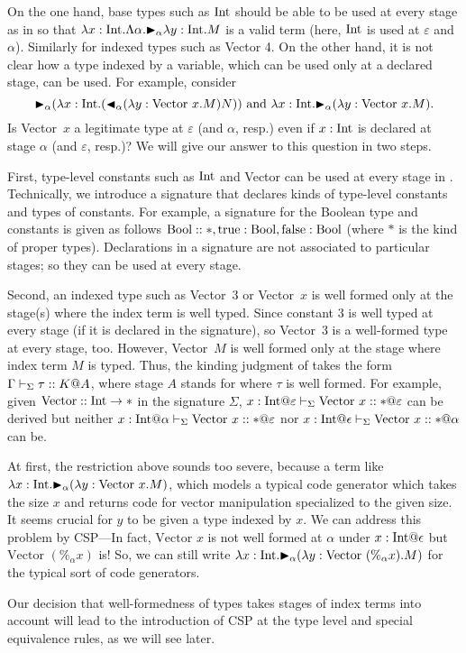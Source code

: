 On the one hand, base types such as \(\textrm{Int}\) should be able to be used
at every stage as in \LTP so that
\(\lambda x:\textrm{Int}.\Lambda \alpha. {\mathop{\blacktriangleright}}_\alpha \lambda y:\textrm{Int}.M\) is a valid
term (here, \(\textrm{Int}\) is used at \(\varepsilon\) and \(\alpha\)).
Similarly for indexed types such as Vector 4.  On the other hand, it
is not clear how a type indexed by a variable, which can be used only
at a declared stage, can be used.  For example,
consider
\[{\mathop{\blacktriangleright}}_\alpha (\lambda x:\textrm{Int}. ({\mathop{\blacktriangleleft}}_\alpha (\lambda y:\text{Vector
  }x.M)N) )
  \text{ and }
  \lambda x:\textrm{Int}. {\mathop{\blacktriangleright}}_\alpha (\lambda y:\text{Vector }x.M).
\]
Is Vector\ \(x\) a legitimate type at \(\varepsilon\) (and \(\alpha\),
resp.)  even if \(x:\textrm{Int}\) is declared at stage \(\alpha\) (and
\(\varepsilon\), resp.)?  We will give our answer to this question in two
steps.

First, type-level constants such as \(\textrm{Int}\) and Vector can be used at
every stage in \LMD.  Technically, we introduce a signature that
declares kinds of type-level constants and types of constants.  For
example, a signature for the Boolean type and constants is given as
follows $\textrm{Bool}::*, \text{true}:\textrm{Bool}, \text{false}:\textrm{Bool}$ (where $*$ is the
kind of proper types).  Declarations in a signature are not
associated to particular stages; so they can be used at every stage.

Second, an indexed type such as Vector\ 3 or Vector\ $x$ is well
formed only at the stage(s) where the index term is well typed.  Since
constant \(3\) is well typed at every stage (if it is declared in the
signature), so Vector\ 3 is a well-formed type at every stage, too.
However, Vector\ $M$ is well formed only at the stage where index term
$M$ is typed.  Thus, the kinding judgment
of \LMD takes the form \(\Gamma\vdash_\Sigma \tau :: K @ A\), where stage $A$ stands for
where \(\tau\) is well formed.  For example,
given \(\text{Vector}:: \textrm{Int} \rightarrow *\) in the signature \(\Sigma\),
\(x:\I@\varepsilon \V \text{Vector }x :: * @\varepsilon\) can be
derived but
neither
\(x:\I@\alpha \V \text{Vector }x :: * @\varepsilon\)
nor 
\(x:\I@\epsilon \V \text{Vector }x :: * @\alpha\)
can be.

At first, the restriction above sounds too severe, because a term like
\(\lambda x:\textrm{Int}. {\mathop{\blacktriangleright}}_\alpha (\lambda y:\text{Vector }x.M) \), which
models a typical code generator which takes the size $x$ and returns
code for vector manipulation specialized to the given size.  It seems
crucial for \(y\) to be given a type indexed by $x$.  We can address
this problem by CSP---In fact,
$\text{Vector }x$ is not well formed at $\alpha$ under $x:\I@\epsilon$
but $\text{Vector }(\%_\alpha x)$ is!  So, we can still write
\(\lambda x:\textrm{Int}. {\mathop{\blacktriangleright}}_\alpha (\lambda y:\text{Vector }(\%_\alpha x).M) \)
for the typical sort of code generators.

Our decision that well-formedness of types takes stages of index terms
into account will lead to the introduction of CSP at the type level
and special equivalence rules, as we will see later.
